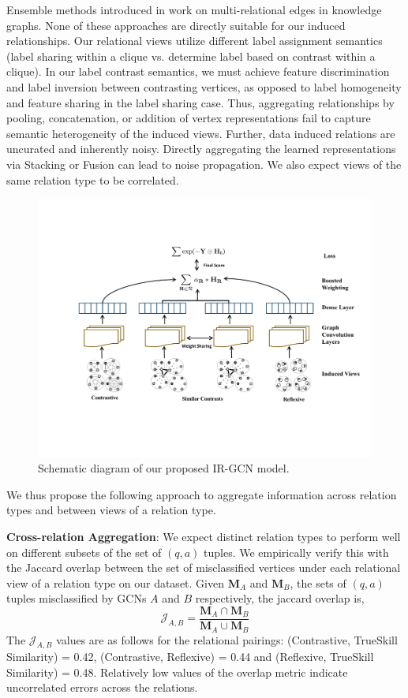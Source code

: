 Ensemble methods introduced in \cite{relationalGCN} work on multi-relational edges in knowledge graphs. None of these approaches are directly suitable for our induced relationships. Our relational views utilize different label assignment semantics (label sharing within a clique vs. determine label based on contrast within a clique). In our label contrast semantics, we must achieve feature discrimination and label inversion between contrasting vertices, as opposed to label homogeneity and feature sharing in the label sharing case. Thus, aggregating relationships by pooling, concatenation, or addition of vertex representations fail to capture semantic heterogeneity of the induced views.
Further, data induced relations are uncurated and inherently noisy. Directly aggregating the learned representations via Stacking or Fusion can lead to noise propagation. We also expect views of the same relation type to be correlated.

\begin{figure}[tbh]
    \centering
    \includegraphics[scale=0.67]{figures/Architecture_new.pdf}
    \caption{\label{fig:adaboost} Schematic diagram of our proposed IR-GCN model.}
\end{figure}

We thus propose the following approach to aggregate information across relation types and between views of a relation type.

\noindent
\textbf{Cross-relation Aggregation}: We expect distinct relation types to perform well on different subsets of the set of $(q,a)$ tuples. We empirically verify this with the Jaccard overlap between the set of misclassified vertices under each relational view of a relation type on our dataset. Given $\mathbf{M}_A$ and $\mathbf{M}_B$, the sets of $(q,a)$ tuples misclassified by GCNs $A$ and $B$ respectively, the jaccard overlap is,
\begin{equation}
 \mathcal{J}_{A,B} = \frac{\mathbf{M}_A \cap \mathbf{M}_B}{\mathbf{M}_A \cup \mathbf{M}_B}
\end{equation}
The $\mathcal{J}_{A,B}$ values are as follows for the relational pairings: (Contrastive, TrueSkill Similarity) = 0.42, (Contrastive, Reflexive) = 0.44 and (Reflexive, TrueSkill Similarity) = 0.48. Relatively low values of the overlap metric indicate uncorrelated errors across the relations.

